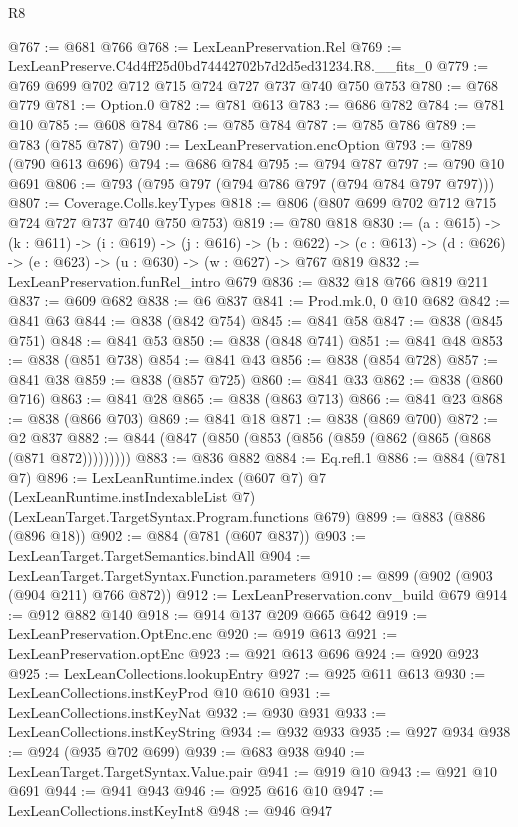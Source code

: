 \begin{lexlean}{R8}
\begin{coremodule}
@767 := @681 @766
@768 := LexLeanPreservation.Rel
@769 := LexLeanPreserve.C4d4ff25d0bd74442702b7d2d5ed31234.R8.__fits_0
@779 := @769 @699 @702 @712 @715 @724 @727 @737 @740 @750 @753
@780 := @768 @779
@781 := Option.{0}
@782 := @781 @613
@783 := @686 @782
@784 := @781 @10
@785 := @608 @784
@786 := @785 @784
@787 := @785 @786
@789 := @783 (@785 @787)
@790 := LexLeanPreservation.encOption
@793 := @789 (@790 @613 @696)
@794 := @686 @784
@795 := @794 @787
@797 := @790 @10 @691
@806 := @793 (@795 @797 (@794 @786 @797 (@794 @784 @797 @797)))
@807 := Coverage.Colls.keyTypes
@818 := @806 (@807 @699 @702 @712 @715 @724 @727 @737 @740 @750 @753)
@819 := @780 @818
@830 := (a : @615) ->
  (k : @611) ->
  (i : @619) ->
  (j : @616) ->
  (b : @622) -> (c : @613) -> (d : @626) -> (e : @623) -> (u : @630) -> (w : @627) -> @767 @819
@832 := LexLeanPreservation.funRel_intro @679
@836 := @832 @18 @766 @819 @211
@837 := @609 @682
@838 := @6 @837
@841 := Prod.mk.{0, 0} @10 @682
@842 := @841 @63
@844 := @838 (@842 @754)
@845 := @841 @58
@847 := @838 (@845 @751)
@848 := @841 @53
@850 := @838 (@848 @741)
@851 := @841 @48
@853 := @838 (@851 @738)
@854 := @841 @43
@856 := @838 (@854 @728)
@857 := @841 @38
@859 := @838 (@857 @725)
@860 := @841 @33
@862 := @838 (@860 @716)
@863 := @841 @28
@865 := @838 (@863 @713)
@866 := @841 @23
@868 := @838 (@866 @703)
@869 := @841 @18
@871 := @838 (@869 @700)
@872 := @2 @837
@882 := @844 (@847 (@850 (@853 (@856 (@859 (@862 (@865 (@868 (@871 @872)))))))))
@883 := @836 @882
@884 := Eq.refl.{1}
@886 := @884 (@781 @7)
@896 := LexLeanRuntime.index
    (@607 @7)
    @7
    (LexLeanRuntime.instIndexableList @7)
    (LexLeanTarget.TargetSyntax.Program.functions @679)
@899 := @883 (@886 (@896 @18))
@902 := @884 (@781 (@607 @837))
@903 := LexLeanTarget.TargetSemantics.bindAll
@904 := LexLeanTarget.TargetSyntax.Function.parameters
@910 := @899 (@902 (@903 (@904 @211) @766 @872))
@912 := LexLeanPreservation.conv_build @679
@914 := @912 @882 @140
@918 := @914 @137 @209 @665 @642
@919 := LexLeanPreservation.OptEnc.enc
@920 := @919 @613
@921 := LexLeanPreservation.optEnc
@923 := @921 @613 @696
@924 := @920 @923
@925 := LexLeanCollections.lookupEntry
@927 := @925 @611 @613
@930 := LexLeanCollections.instKeyProd @10 @610
@931 := LexLeanCollections.instKeyNat
@932 := @930 @931
@933 := LexLeanCollections.instKeyString
@934 := @932 @933
@935 := @927 @934
@938 := @924 (@935 @702 @699)
@939 := @683 @938
@940 := LexLeanTarget.TargetSyntax.Value.pair
@941 := @919 @10
@943 := @921 @10 @691
@944 := @941 @943
@946 := @925 @616 @10
@947 := LexLeanCollections.instKeyInt8
@948 := @946 @947

\end{coremodule}
\end{lexlean}
